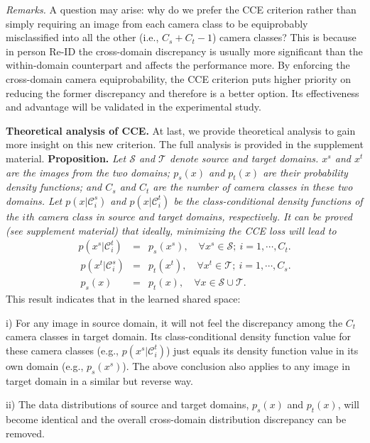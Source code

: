 \documentclass[10pt,twocolumn,letterpaper]{article}
\begin{document}
\textit{Remarks.} A question may arise: why do we prefer the CCE criterion rather than simply requiring an image from each camera class to be equiprobably misclassified into all the other (i.e., $C_{s}+C_{t}-1$) camera classes? This is because in person Re-ID the cross-domain discrepancy is usually more significant than the within-domain counterpart and affects the performance more. By enforcing the cross-domain camera equiprobability, the CCE criterion puts higher priority on reducing the former discrepancy and therefore is a better option. Its effectiveness and advantage will be validated in the experimental study.     
 
\textbf{Theoretical analysis of CCE.} At last, we provide theoretical analysis to gain more insight on this new criterion. The full analysis is provided in the supplement material. 
\textbf{Proposition.} \textit{Let ${\mathcal S}$ and ${\mathcal T}$ denote source and target domains. $x^s$ and $x^t$ are the images from the two domains; $p_s(x)$ and $p_t(x)$ are their probability density functions; and $C_s$ and $C_t$ are the number of camera classes in these two domains. Let $p(x|\mathcal{C}^s_i)$ and $p(x|\mathcal{C}^t_i)$ be the class-conditional density functions of the $i$th camera class in source and target domains, respectively. It can be proved (see supplement material) that ideally, minimizing the CCE loss will lead to}
\begin{eqnarray}\label{eqn:proposition} 
p(x^s|\mathcal{C}^t_i) &=& p_s(x^s),\quad \forall x^s \in {\mathcal S};~i=1,\cdots,C_t.\\~\nonumber
p(x^t|\mathcal{C}^s_i) &=& p_t(x^t),\quad \forall x^t \in {\mathcal T};~i=1,\cdots,C_s.\\~\nonumber
p_s(x) &=& p_t(x), \quad \forall x \in {\mathcal S}\cup{\mathcal T}.
\end{eqnarray}This result indicates that in the learned shared space: 
 
i) For any image in source domain, it will not feel the discrepancy among the $C_t$ camera classes in target domain. Its class-conditional density function value for these camera classes (e.g., $p(x^s|\mathcal{C}^t_i)$) just equals its density function value in its own domain (e.g., $p_s(x^s)$). The above conclusion also applies to any image in target domain in a similar but reverse way. 
 


ii) The data distributions of source and target domains, $p_s(x)$ and $p_t(x)$, will become identical and the overall cross-domain distribution discrepancy can be removed. 
 
\end{document}
